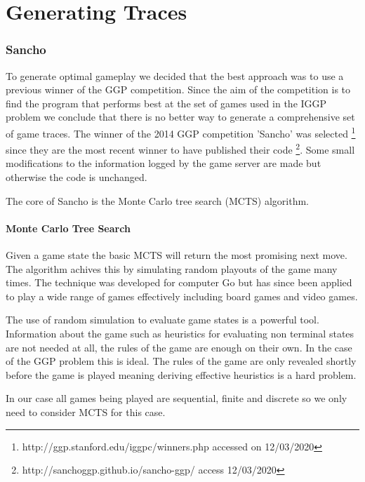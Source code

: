 \chapter{Generating Traces}
\subsection{Sancho}
To generate optimal gameplay we decided that the best approach was to use a previous winner of the GGP competition. Since the aim of the competition is to find the program that performs best at the set of games used in the IGGP problem we conclude that there is no better way to generate a comprehensive set of game traces. The winner of the 2014 GGP competition 'Sancho' was selected \footnote{http://ggp.stanford.edu/iggpc/winners.php accessed on 12/03/2020} since they are the most recent winner to have published their code \footnote{http://sanchoggp.github.io/sancho-ggp/ access 12/03/2020}. Some small modifications to the information logged by the game server are made but otherwise the code is unchanged.

The core of Sancho is the Monte Carlo tree search (MCTS) algorithm.

\subsubsection{Monte Carlo Tree Search}
Given a game state the basic MCTS will return the most promising next move. The algorithm achives this by simulating random playouts of the game many times. The technique was developed for computer Go but has since been applied to play a wide range of games effectively including board games and video games\cite{Silver/MCTS}\cite{Chaslot/MCTS}.

The use of random simulation to evaluate game states is a powerful tool. Information about the game such as heuristics for evaluating non terminal states are not needed at all, the rules of the game are enough on their own. In the case of the GGP problem this is ideal. The rules of the game are only revealed shortly before the game is played meaning deriving effective heuristics is a hard problem.

In our case all games being played are sequential, finite and discrete so we only need to consider MCTS for this case.

